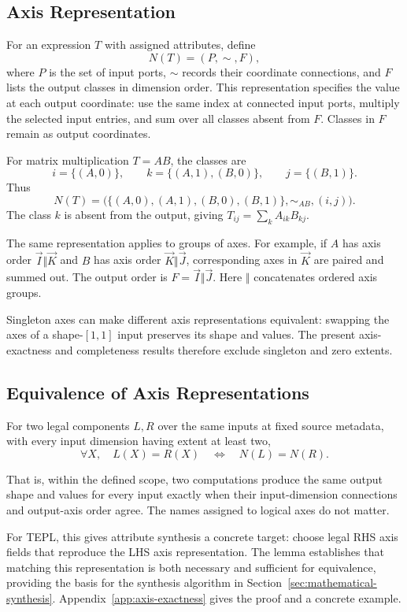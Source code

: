 \subsection{Axis Representation}
\label{sec:axis-representation}
For an expression $T$ with assigned attributes, define
\begin{equation}
 N(T)=(P,\sim,F),
 \label{eq:axis-representation}
\end{equation}
where $P$ is the set of input ports, $\sim$ records their coordinate
connections, and $F$ lists the output classes in dimension order. This representation
specifies the value at each output coordinate: use the same index at
connected input ports, multiply the selected input entries, and sum over
all classes absent from $F$. Classes in $F$ remain as output coordinates.

For matrix multiplication $T=AB$, the classes are
\begin{equation}
 i=\{(A,0)\},\qquad k=\{(A,1),(B,0)\},\qquad j=\{(B,1)\}.
\end{equation}
Thus
\begin{equation}
 N(T)=\bigl(\{(A,0),(A,1),(B,0),(B,1)\},\sim_{AB},(i,j)\bigr).
\end{equation}
The class $k$ is absent from the output, giving $T_{ij}=\sum_k A_{ik}B_{kj}$.

The same representation applies to groups of axes. For example, if $A$ has
axis order $\vec I\Vert\vec K$ and $B$ has axis order $\vec K\Vert\vec J$,
corresponding axes in $\vec K$ are paired and summed out. The output order is
$F=\vec I\Vert\vec J$.
Here $\Vert$ concatenates ordered axis groups.

Singleton axes can make different axis representations equivalent:
swapping the axes of a shape-$[1,1]$ input preserves its shape and values.
The present axis-exactness and completeness results therefore exclude
singleton and zero extents.

\subsection{Equivalence of Axis Representations}
\begin{lemma}
\label{lem:axis-exactness}
For two legal components $L,R$ over the same inputs at fixed source metadata,
with every input dimension having extent at least two,
\begin{equation}
 \forall X,\quad L(X)=R(X)\quad\iff\quad N(L)=N(R).
 \label{eq:axis-exactness}
\end{equation}
\end{lemma}
That is, within the defined scope, two computations produce the same output
shape and values for every input exactly when their input-dimension connections
and output-axis order agree. The names assigned to logical axes do not matter.

For TEPL, this gives attribute synthesis a concrete target: choose legal RHS
axis fields that reproduce the LHS axis representation. The lemma establishes
that matching this representation is both necessary and sufficient for
equivalence, providing the basis for the synthesis algorithm in
Section~\ref{sec:mathematical-synthesis}. Appendix~\ref{app:axis-exactness}
gives the proof and a concrete example.
